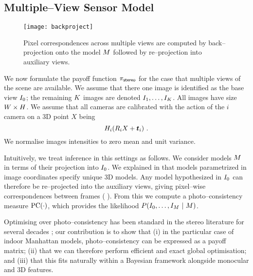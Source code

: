 \subsection{Multiple--View Sensor Model}

\begin{figure}[tb]
  \centering \texttt{[image: backproject]}
  \caption{Pixel correspondences across multiple views are computed by
    back--projection onto the model $\Scene$ followed by re--projection into
    auxiliary views.}
  \label{fig:backproject}
\end{figure}
We now formulate the payoff function $\StereoPayoff$ for the case that
multiple views of the scene are available. We assume that there one
image is identified as the base view $\Image_0$; the remaining
$\NumViews$ images are denoted
$\Image_1,\ldots,\Image_{\NumViews}$. All images have size
$\Width\times\Height$. We assume that all cameras are calibrated with
the action of the $i$\th camera on a 3D point $X$ being
\begin{equation}
  \CamMatrix_i (\CamR_i X + \CamTr_i) ~.
\end{equation}
We normalise images intensities to zero mean and unit variance.

Intuitively, we treat inference in this settings as follows. We
consider models $\Scene$ in terms of their projection into
$\Image_0$. We explained in  that models parametrized in
image coordinates specify unique 3D models. Any model hypothesized in
$\Image_0$ can therefore be re--projected into the auxiliary views,
giving pixel--wise correspondences between frames (\cf
{}). From this we compute a photo--consistency
measure $\pc(\cdot)$, which provides the likelihood $P(\StereoData ~|~
\Scene)$.

Optimising over photo--consistency has been standard in the stereo
literature for several decades \cite{Scharstein01}; our contribution
is to show that (i) in the particular case of indoor Manhattan models,
photo--consistency can be expressed as a payoff matrix; (ii) that we
can therefore perform efficient and exact global optimisation; and
(iii) that this fits naturally within a Bayesian framework alongside
monocular and 3D features.

